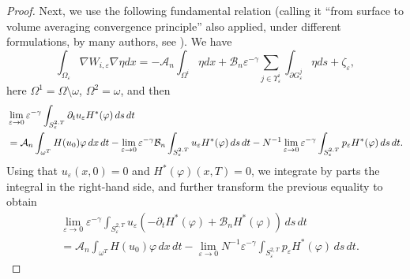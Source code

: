 \documentclass[reqno]{amsart}
\begin{document}
\begin{proof}
Next, we use the following fundamental relation 
(calling it ``from surface to volume averaging
convergence principle'' \cite[Theorem 4.5]{DiGoShBook} 
also applied, under different
formulations, by many authors, see
\cite{OlSh95, ZuShDiffEq}).
 We have
\begin{equation}
\int _{\Omega _{\varepsilon }}\nabla W_{i,\varepsilon }\nabla \eta {dx%
}=-\mathcal{A}_n\int _{\Omega ^{i}}\eta {dx}+\mathcal{B}%
_n\varepsilon ^{-\gamma }\sum _{j\in \Upsilon _{\varepsilon
}^{i}}\int _{\partial G_{\varepsilon }^{j}}\eta {ds}+\zeta
_{\varepsilon },  \label{w limit relation}
\end{equation}
here $\Omega ^{1}=\Omega \setminus \omega $, $\Omega ^2=\omega $, and then
\begin{align*}
&\lim _{\varepsilon \to 0}\varepsilon ^{-\gamma }\int
_{S_{\varepsilon }^{2,T}}\partial _{t}u_{\varepsilon }H^{\ast
}(\varphi )\,ds\,dt \\
&=\mathcal{A}_n\int _{\omega ^{T}}H(u_0)\varphi {%
\,dx\,dt}-\lim _{\varepsilon \to 0}\varepsilon ^{-\gamma }%
\mathcal{B}_n\int _{S_{\varepsilon }^{2,T}}u_{\varepsilon }H^{\ast
}(\varphi )\,ds\,dt
-N^{-1}\lim _{\varepsilon \to 0}\varepsilon ^{-\gamma }\int
_{S_{\varepsilon }^{2,T}}p_{\varepsilon }H^{\ast }(\varphi )\,ds\,dt.
\end{align*}
Using that $u_{\varepsilon }(x,0)=0$ and $H^{\ast }(\varphi )(x,T)=0$, we
integrate by parts the integral in the right-hand side, and further
transform the previous equality to obtain
\begin{equation}
\begin{aligned}
&\lim _{\varepsilon \to 0}\varepsilon ^{-\gamma }\int
_{S_{\varepsilon }^{2,T}}u_{\varepsilon }(-\partial _{t}H^{\ast
}(\varphi )+\mathcal{B}_nH^{\ast }(\varphi ))\,ds\,dt    \\
&=\mathcal{A}_n\int _{\omega ^{T}}H(u_0)\varphi \,dx\,dt-\lim
_{\varepsilon \to 0}N^{-1}\varepsilon ^{-\gamma }\int
_{S_{\varepsilon }^{2,T}}p_{\varepsilon }H^{\ast }(\varphi )\,ds\,dt.
\end{aligned} \label{thm: u limit rel 1}
\end{equation}


\end{proof}
\end{document}
